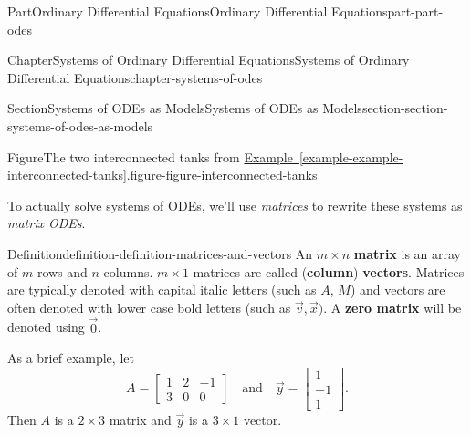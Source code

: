 \documentclass[twoside,10pt,]{book}
\newcommand{\xreffont}{\relax}
\newcommand{\terminology}[1]{\textbf{#1}}
\numberwithin{equation}{part}
\begin{document}
\begin{partptx}{Part}{Ordinary Differential Equations}{}{Ordinary Differential Equations}{}{}{part-part-odes}
\begin{chapterptx}{Chapter}{Systems of Ordinary Differential Equations}{}{Systems of Ordinary Differential Equations}{}{}{chapter-systems-of-odes}
\begin{sectionptx}{Section}{Systems of ODEs as Models}{}{Systems of ODEs as Models}{}{}{section-section-systems-of-odes-as-models}
\begin{figureptx}{Figure}{The two interconnected tanks from \hyperref[example-example-interconnected-tanks]{Example~{\xreffont\ref{example-example-interconnected-tanks}}}.}{figure-figure-interconnected-tanks}{}
\begin{image}{0}{1}{0}{}
{
}%
\end{image}%
\tcblower
\end{figureptx}%
To actually solve systems of ODEs, we'll use \emph{matrices} to rewrite these systems as \emph{matrix ODEs}.%
\begin{definition}{Definition}{}{definition-definition-matrices-and-vectors}%
%
%
An \(m\times n\) \terminology{matrix} is an array of \(m\) rows and \(n\) columns. \(m\times1\) matrices are called (\terminology{column}) \terminology{vectors}. Matrices are typically denoted with capital italic letters (such as \(A\), \(M\)) and vectors are often denoted with lower case bold letters (such as \(\vec{v},\vec{x})\). A \terminology{zero matrix} will be denoted using \(\vec{0}\).%
\end{definition}
As a brief example, let%
\begin{equation*}
A = \begin{bmatrix} 1&2&-1\\3&0&0\end{bmatrix}\quad\text{and}\quad \vec{y} = \begin{bmatrix} 1\\-1\\1 \end{bmatrix}.
\end{equation*}
Then \(A\) is a \(2\times3\) matrix and \(\vec{y}\) is a \(3\times 1\) vector.%

\end{sectionptx}
\end{chapterptx}
\end{partptx}
\end{document}
